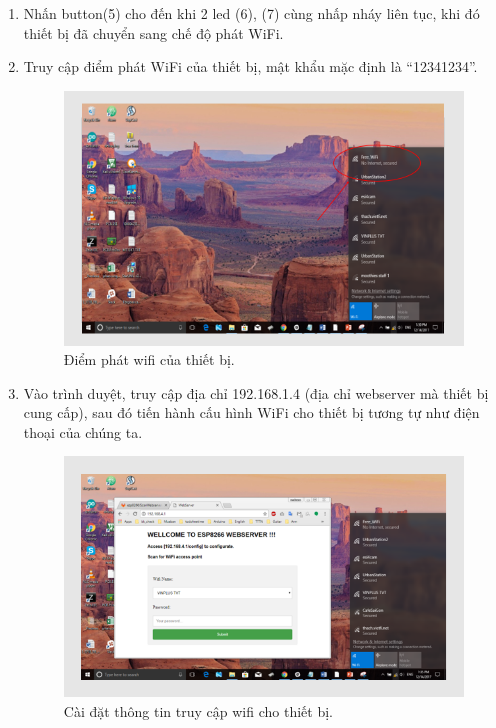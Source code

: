 \documentclass[a4paper,12pt,oneside]{article}
\begin{document}
\begin{enumerate}
\item Nhấn button(5) cho đến khi 2 led (6), (7) cùng nhấp nháy liên tục, khi đó thiết bị đã chuyển sang chế độ phát WiFi.
\item Truy cập điểm phát WiFi của thiết bị, mật khẩu mặc định là “12341234”.

	\begin{figure}[H]
	\centering
	\includegraphics[scale=.7]{hinh/wifi-config-1.png}
	\caption{Điểm phát wifi của thiết bị.}
	\end{figure}
\item Vào trình duyệt, truy cập địa chỉ 192.168.1.4 (địa chỉ webserver mà thiết bị cung cấp), sau đó tiến hành cấu hình WiFi cho thiết bị tương tự như điện thoại của chúng ta.
	
	\begin{figure}[H]
	\centering
	\includegraphics[scale=.7]{hinh/wifi-config-2.png}
	\caption{Cài đặt thông tin truy cập wifi cho thiết bị.}
	\end{figure}
	

\end{enumerate}
\end{document}
